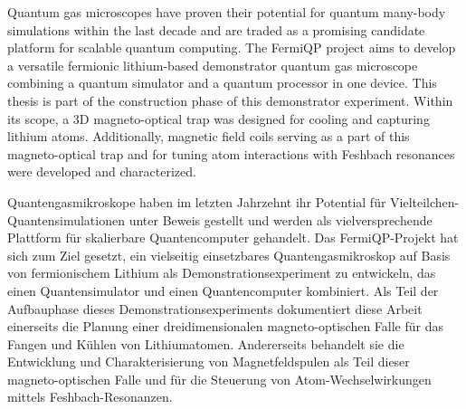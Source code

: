 Quantum gas microscopes have proven their potential for quantum many-body simulations within the last decade and are traded as a promising candidate platform for scalable quantum computing. The FermiQP project aims to develop a versatile fermionic lithium-based demonstrator quantum gas microscope combining a quantum simulator and a quantum processor in one device. This thesis is part of the construction phase of this demonstrator experiment. Within its scope, a 3D magneto-optical trap was designed for cooling and capturing lithium atoms. Additionally, magnetic field coils serving as a part of this magneto-optical trap and for tuning atom interactions with Feshbach resonances were developed and characterized.
\vspace{2cm}

Quantengasmikroskope haben im letzten Jahrzehnt ihr Potential für Vielteilchen-Quantensimulationen unter Beweis gestellt und werden als vielversprechende Plattform für skalierbare Quantencomputer gehandelt. Das FermiQP-Projekt hat sich zum Ziel gesetzt, ein vielseitig einsetzbares Quantengasmikroskop auf Basis von fermionischem Lithium als Demonstrationsexperiment zu entwickeln, das einen Quantensimulator und einen Quantencomputer kombiniert. Als Teil der Aufbauphase dieses Demonstrationsexperiments dokumentiert diese Arbeit einerseits die Planung einer dreidimensionalen magneto-optischen Falle für das Fangen und Kühlen von Lithiumatomen. Andererseits behandelt sie die Entwicklung und Charakterisierung von Magnetfeldspulen als Teil dieser magneto-optischen Falle und für die Steuerung von Atom-Wechselwirkungen mittels Feshbach-Resonanzen.